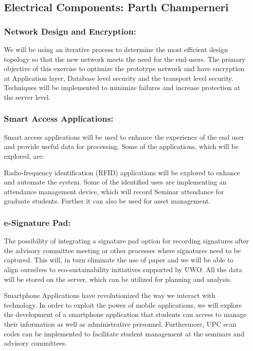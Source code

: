 \documentclass{journal}
\begin{document}
\subsection{ Electrical Components: Parth Champerneri }

\subsubsection{Network Design and Encryption:}

We will be using an iterative process to determine the most efficient design topology so that the new network meets the need for the end-users. The primary objective of this exercise to optimize the prototype network and have encryption at Application layer, Database level security and the transport level security. Techniques will be implemented to minimize failures and increase protection at the server level. 

\subsubsection{Smart Access Applications:} Smart access applications will be used to enhance the experience of the end user and provide useful data for processing. Some of the applications, which will be explored, are:

Radio-frequency identification (RFID) applications will be explored to enhance and automate the system. Some of the identified uses are implementing an attendance management device, which will record Seminar attendance for graduate students. Further it can also be used for asset management.

\subsubsection{e-Signature Pad:} The possibility of integrating a signature pad option for recording signatures after the advisory committee meeting or other processes where signatures need to be captured. This will, in turn eliminate the use of paper and we will be able to align ourselves to eco-sustainability initiatives supported by UWO. All the data will be stored on the server, which can be utilized for planning and analysis.

Smartphone Applications have revolutionized the way we interact with technology. In order to exploit the power of mobile applications, we will explore the development of a smartphone application that students can access to manage their information as well as administrative personnel. Furthermore, UPC scan codes can be implemented to facilitate student management at the seminars and advisory committees.
\end{document}
